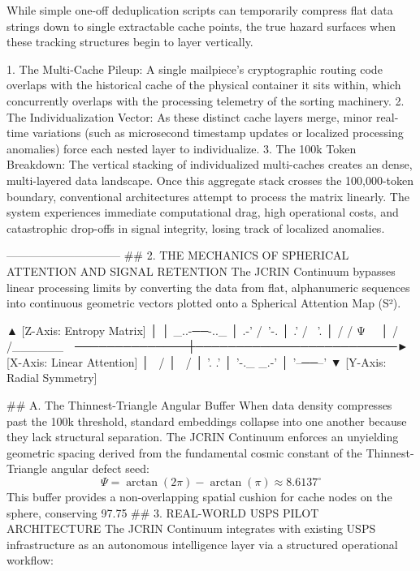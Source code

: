 While simple one-off deduplication scripts can temporarily compress flat data strings down to single extractable cache points, the true hazard surfaces when these tracking structures begin to layer vertically.

   1. The Multi-Cache Pileup: A single mailpiece's cryptographic routing code overlaps with the historical cache of the physical container it sits within, which concurrently overlaps with the processing telemetry of the sorting machinery.
   2. The Individualization Vector: As these distinct cache layers merge, minor real-time variations (such as microsecond timestamp updates or localized processing anomalies) force each nested layer to individualize.
   3. The 100k Token Breakdown: The vertical stacking of individualized multi-caches creates an dense, multi-layered data landscape. Once this aggregate stack crosses the 100,000-token boundary, conventional architectures attempt to process the matrix linearly. The system experiences immediate computational drag, high operational costs, and catastrophic drop-offs in signal integrity, losing track of localized anomalies.

------------------------------
## 2. THE MECHANICS OF SPHERICAL ATTENTION AND SIGNAL RETENTION
The JCRIN Continuum bypasses linear processing limits by converting the data from flat, alphanumeric sequences into continuous geometric vectors plotted onto a Spherical Attention Map (S²).

                ▲ [Z-Axis: Entropy Matrix]
                │
                │        _..-──-.._
                │     .-'    /\    '-.
                │   .'      /  \      '.
                │  /       / Ψ  \       \
                │ /       /______\       \
  ──────────────┼─────────────────────────► [X-Axis: Linear Attention]
                │ \                       /
                │  \                     /
                │   '.                 .'
                │     '-._         _.-'
                │         '--──--'
                ▼ [Y-Axis: Radial Symmetry]

## A. The Thinnest-Triangle Angular Buffer
When data density compresses past the 100k threshold, standard embeddings collapse into one another because they lack structural separation. The JCRIN Continuum enforces an unyielding geometric spacing derived from the fundamental cosmic constant of the Thinnest-Triangle angular defect seed:
$$\Psi = \arctan(2\pi) - \arctan(\pi) \approx 8.6137^\circ$$ This buffer provides a non-overlapping spatial cushion for cache nodes on the sphere, conserving 97.75%
## 3. REAL-WORLD USPS PILOT ARCHITECTURE
The JCRIN Continuum integrates with existing USPS infrastructure as an autonomous intelligence layer via a structured operational workflow:

